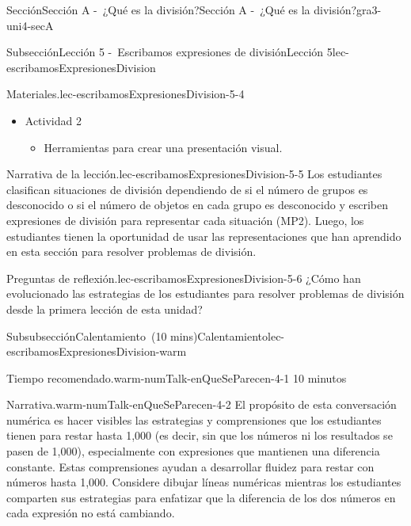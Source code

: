 \documentclass[oneside,10pt,]{article}
\begin{document}
\begin{sectionptx}{Sección}{Sección A -~¿Qué es la división?}{}{Sección A -~¿Qué es la división?}{}{}{gra3-uni4-secA}
\begin{subsectionptx}{Subsección}{Lección 5 -~Escribamos expresiones de división}{}{Lección 5}{}{}{lec-escribamosExpresionesDivision}
\begin{introduction}{}
\begin{paragraphs}{Materiales.}{lec-escribamosExpresionesDivision-5-4}
\begin{itemize}[label=\textbullet]
\item{}Actividad 2%
%
\begin{itemize}[label=$\circ$]
\item{}Herramientas para crear una presentación visual.%
\end{itemize}
\end{itemize}
\end{paragraphs}%
\begin{paragraphs}{Narrativa de la lección.}{lec-escribamosExpresionesDivision-5-5}%
Los estudiantes clasifican situaciones de división dependiendo de si el número de grupos es desconocido o si el número de objetos en cada grupo es desconocido y escriben expresiones de división para representar cada situación (MP2). Luego, los estudiantes tienen la oportunidad de usar las representaciones que han aprendido en esta sección para resolver problemas de división.%
\end{paragraphs}%
\begin{paragraphs}{Preguntas de reflexión.}{lec-escribamosExpresionesDivision-5-6}%
¿Cómo han evolucionado las estrategias de los estudiantes para resolver problemas de división desde la primera lección de esta unidad?%
\end{paragraphs}%
\end{introduction}%
%
%
\typeout{************************************************}
\typeout{************************************************}
%
\begin{subsubsectionptx}{Subsubsección}{Calentamiento~(10 mins)}{}{Calentamiento}{}{}{lec-escribamosExpresionesDivision-warm}
\par
\begin{paragraphs}{Tiempo recomendado.}{warm-numTalk-enQueSeParecen-4-1}%
10 minutos%
\end{paragraphs}%
\begin{paragraphs}{Narrativa.}{warm-numTalk-enQueSeParecen-4-2}%
El propósito de esta conversación numérica es hacer visibles las estrategias y comprensiones que los estudiantes tienen para restar hasta 1,000 (es decir, sin que los números ni los resultados se pasen de 1,000), especialmente con expresiones que mantienen una diferencia constante. Estas comprensiones ayudan a desarrollar fluidez para restar con números hasta 1,000. Considere dibujar líneas numéricas mientras los estudiantes comparten sus estrategias para enfatizar que la diferencia de los dos números en cada expresión no está cambiando.%
\end{paragraphs}%

\end{subsubsectionptx}
\end{subsectionptx}
\end{sectionptx}
\end{document}
